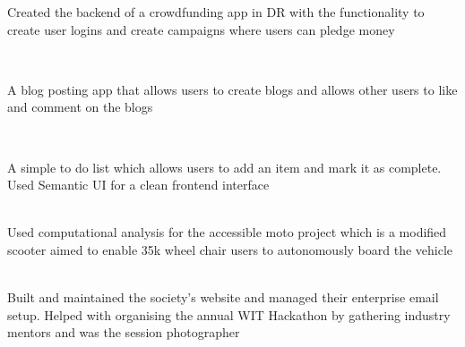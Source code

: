 \documentclass[11pt, a4paper]{MagicalCV}
\begin{document}
Created the backend of a crowdfunding app in DR with the functionality to create user logins and create campaigns where users can pledge money

 \\
 
A blog posting app that allows users to create blogs and allows other users to like and comment on the blogs

 \\
 
A simple to do list which allows users to add an item and mark it as complete. Used Semantic UI for a clean frontend interface
 


 \\
\vspace{\topsep} %
Used computational analysis for the accessible moto project which is a modified scooter aimed to enable 35k wheel chair users to autonomously board the vehicle
\sectionsep

 \\
\vspace{\topsep} %
Built and maintained the society's website and managed their enterprise email setup. Helped with organising the annual WIT Hackathon by gathering industry mentors and was the session photographer
\sectionsep
\end{document}
